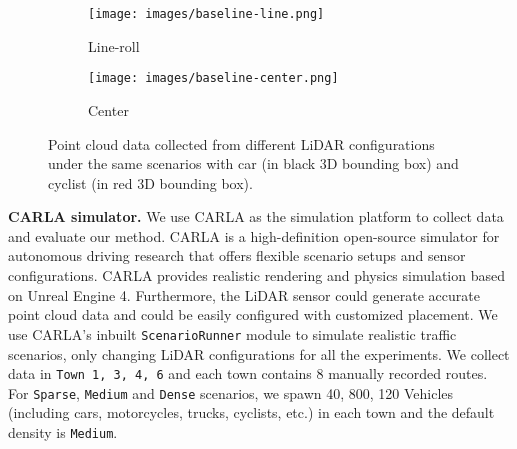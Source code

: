 \documentclass[10pt,twocolumn,letterpaper]{article}
\begin{document}
\begin{figure}[h]
\begin{center}
    \begin{subfigure}[b]{0.235\textwidth}
                \texttt{[image: images/baseline-line.png]}
                \caption{Line-roll}
                \label{fig:baseline-line}
    \end{subfigure}%
    \begin{subfigure}[b]{0.235\textwidth}
                \texttt{[image: images/baseline-center.png]}
                \caption{Center}
                \label{fig:baseline-center}
    \end{subfigure}%
\end{center}
\vspace*{-5mm}
  \caption{Point cloud data collected from different LiDAR configurations under the same scenarios with car (in black 3D bounding box) and cyclist (in red 3D bounding  box).
  }
\label{fig:compare-config}
\vspace*{-5mm}
\end{figure}

\textbf{CARLA simulator.} We use CARLA as the simulation platform to collect data and evaluate our method. CARLA is a high-definition open-source simulator for autonomous driving research \cite{chen2020learning,chen2019model} that offers flexible scenario setups and sensor configurations. CARLA provides realistic rendering and physics simulation based on Unreal Engine 4. Furthermore, the LiDAR sensor could generate accurate point cloud data and could be easily configured with customized placement.
We use CARLA's inbuilt \texttt{ScenarioRunner} module to simulate  realistic traffic scenarios, only changing  LiDAR configurations for all the experiments. We collect data in \texttt{Town 1, 3, 4, 6} and each town contains 8 manually recorded routes. For \texttt{Sparse}, \texttt{Medium} and \texttt{Dense} scenarios, we spawn 40, 800, 120 Vehicles (including cars, motorcycles, trucks, cyclists, etc.) in each town and the default density  is \texttt{Medium}.
\end{document}
